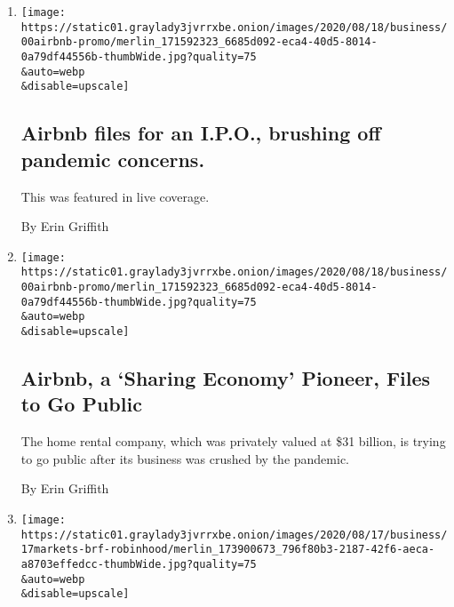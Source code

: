 \begin{enumerate}
\def\labelenumi{\arabic{enumi}.}
\item
  \href{/live/2020/08/19/business/stock-market-today-coronavirus/airbnb-files-for-an-ipo-brushing-off-pandemic-concerns}{}

  \texttt{[image: https://static01.graylady3jvrrxbe.onion/images/2020/08/18/business/00airbnb-promo/merlin\_171592323\_6685d092-eca4-40d5-8014-0a79df44556b-thumbWide.jpg?quality=75\\\&auto=webp\\\&disable=upscale]}

  \hypertarget{airbnb-files-for-an-ipo-brushing-off-pandemic-concerns}{%
  \subsection{Airbnb files for an I.P.O., brushing off pandemic
  concerns.}\label{airbnb-files-for-an-ipo-brushing-off-pandemic-concerns}}

  This was featured in live coverage.

  By Erin Griffith
\item
  \href{/2020/08/19/technology/airbnb-ipo.html}{}

  \texttt{[image: https://static01.graylady3jvrrxbe.onion/images/2020/08/18/business/00airbnb-promo/merlin\_171592323\_6685d092-eca4-40d5-8014-0a79df44556b-thumbWide.jpg?quality=75\\\&auto=webp\\\&disable=upscale]}

  \hypertarget{airbnb-a-sharing-economy-pioneer-files-to-go-public}{%
  \subsection{Airbnb, a `Sharing Economy' Pioneer, Files to Go
  Public}\label{airbnb-a-sharing-economy-pioneer-files-to-go-public}}

  The home rental company, which was privately valued at \$31 billion,
  is trying to go public after its business was crushed by the pandemic.

  By Erin Griffith
\item
  \href{/live/2020/08/17/business/stock-market-today-coronavirus/robinhood-a-stock-trading-app-is-valued-at-11-2-billion-in-its-latest-funding-round}{}

  \texttt{[image: https://static01.graylady3jvrrxbe.onion/images/2020/08/17/business/17markets-brf-robinhood/merlin\_173900673\_796f80b3-2187-42f6-aeca-a8703effedcc-thumbWide.jpg?quality=75\\\&auto=webp\\\&disable=upscale]}

  \hypertarget{robinhood-a-stock-trading-app-is-valued-at-112-billion-in-its-latest-funding-round}{%
}
\end{enumerate}
